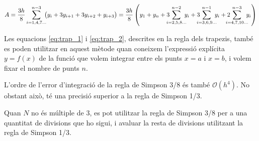  \begin{equation}\label{eq:simp_3_8}
   A =  \frac{3h}{8} \sum_{i=1,4,7\dots}^{n-3} \hspace{-0.5em} \big( y_i + 3 y_{i+1} + 3 y_{i+2} + y_{i+3}\big) =
   \frac{3h}{8} \left( y_1 + y_n + 3 \hspace{-0.7em} \sum_{i=2,5,8\dots}^{n-2} \hspace{-0.5em} y_i +
   3 \hspace{-0.7em} \sum_{i=3,6,9\dots}^{n-1} \hspace{-0.5em} y_i
   + 2 \hspace{-0.9em} \sum_{i=4,7,10\dots}^{n-3} \hspace{-0.5em} y_i \right)
 \end{equation}

 Les equacions \eqref{eq:trap_1} i \eqref{eq:trap_2}, descrites en la regla dels trapezis, també es poden utilitzar en aquest mètode quan  coneixem l'expressió explícita $y=f(x)$ de la funció que volem integrar entre els punts $x=a$ i $x=b$, i volem fixar el nombre de punts $n$.

 L'ordre de l'error d'integració de la regla de Simpson 3/8 és també $\mathscr{O}(h^4)$. No obstant això, té una precisió superior a la regla de Simpson 1/3.
 
 Quan  $N$ no és múltiple de 3, es pot utilitzar la regla de Simpson 3/8 per a una quantitat de divisions que ho sigui, i avaluar la resta de divisions utilitzant la  regla de Simpson 1/3.


